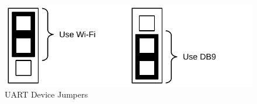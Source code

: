 \begin{figure}[ht]
    \begin{center}
        \includegraphics[scale=0.65]{images/jumper_uart.pdf}
    \end{center}
    \caption{UART Device Jumpers}
    \label{fig:jmp_uart}
\end{figure}